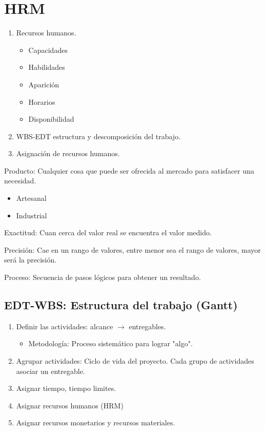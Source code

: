 \section{HRM}

\begin{enumerate}
    \item Recursos humanos.
    \begin{itemize}
        \item Capacidades
        \item Habilidades 
        \item Aparición
        \item Horarios
        \item Disponibilidad
    \end{itemize}
    
    \item WBS-EDT estructura y descomposición del trabajo.
    
    \item Asignación de recursos humanos.
\end{enumerate}

Producto: Cualquier cosa que puede ser ofrecida al mercado para satisfacer una necesidad. 

\begin{itemize}
    \item Artesanal
    \item Industrial
\end{itemize}

Exactitud: Cuan cerca del valor real se encuentra el valor medido.

Precisión: Cae en un rango de valores, entre menor sea el rango de valores, mayor será la precisión. 

Proceso: Secuencia de pasos lógicos para obtener un resultado. 

\subsection{EDT-WBS: Estructura del trabajo (Gantt)}

\begin{enumerate}
    \item Definir las actividades: alcance \( \to \) entregables.
    \begin{itemize}
        \item Metodología: Proceso sistemático para lograr "algo".
    \end{itemize}
    
    \item Agrupar actividades: Ciclo de vida del proyecto. Cada grupo de actividades asociar un entregable. 
    
    \item Asignar tiempo, tiempo limites. 
    
    \item Asignar recursos humanos (HRM)
    
    \item Asignar recursos monetarios y recursos materiales. 
\end{enumerate}